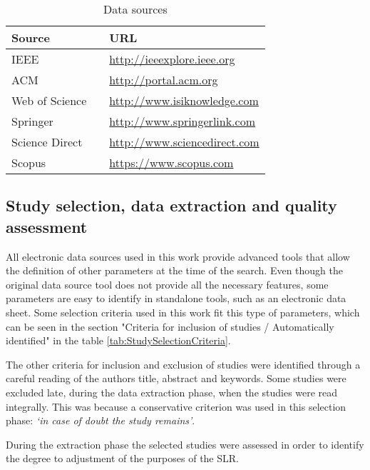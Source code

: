 \begin{table}[ht]
\begin{tabular}{lll}
\hline
Source &  & URL \\ \hline
IEEE &  & \url{http://ieeexplore.ieee.org} \\
ACM &  & \url{http://portal.acm.org} \\
Web of Science &  & \url{http://www.isiknowledge.com} \\
Springer &  & \url{http://www.springerlink.com} \\
Science Direct &  & \url{http://www.sciencedirect.com} \\
Scopus &  & \url{https://www.scopus.com} \\ \hline
\end{tabular}
\caption{Data sources}
\label{tab:DataSources}
\end{table}

\subsection{Study selection, data extraction and quality assessment}
\label{subsec:StudySelAndExt}

All electronic data sources used in this work provide advanced tools that allow the definition of other parameters at the time of the search. Even though the original data source tool does not provide all the necessary features, some parameters are easy to identify in standalone tools, such as an electronic data sheet. Some selection criteria used in this work fit this type of parameters, which can be seen in the section "Criteria for inclusion of studies / Automatically identified" in the table \ref{tab:StudySelectionCriteria}.

The other criteria for inclusion and exclusion of studies were identified through a careful reading of the authors title, abstract and keywords. Some studies were excluded late, during the data extraction phase, when the studies were read integrally. This was because a conservative criterion was used in this selection phase: \textit{`in case of doubt the study remains'}.

During the extraction phase the selected studies were assessed in order to identify the degree to adjustment of the purposes of the \acrshort{SLR}.


